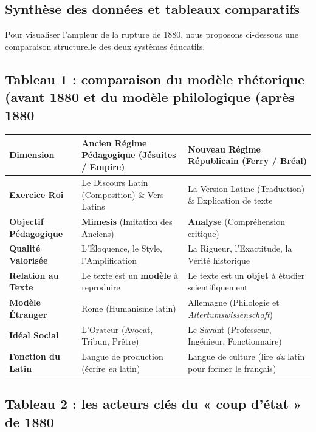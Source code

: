 \subsection{Synthèse des données et tableaux comparatifs}

Pour visualiser l'ampleur de la rupture de 1880, nous proposons ci-dessous une comparaison
structurelle des deux systèmes éducatifs.



\subsection{Tableau 1 : comparaison du modèle rhétorique (avant 1880\) et du modèle philologique (après 1880\)}

\begin{table}[h!]\small\centering\begin{tabular}{| p{2.3cm} | p{3.5cm} | p{3.5cm} |}\hline\textbf{Dimension} & \textbf{Ancien Régime Pédagogique (Jésuites / Empire)} & \textbf{Nouveau Régime Républicain (Ferry / Bréal)} \\ \hline\textbf{Exercice Roi} & Le Discours Latin (Composition) \& Vers Latins & La Version Latine (Traduction) \& Explication de texte \\ \hline\textbf{Objectif Pédagogique} & \textbf{Mimesis} (Imitation des Anciens) & \textbf{Analyse} (Compréhension critique) \\ \hline\textbf{Qualité Valorisée} & L'Éloquence, le Style, l'Amplification & La Rigueur, l'Exactitude, la Vérité historique \\ \hline\textbf{Relation au Texte} & Le texte est un \textbf{modèle} à reproduire & Le texte est un \textbf{objet} à étudier scientifiquement \\ \hline\textbf{Modèle Étranger} & Rome (Humanisme latin) & Allemagne (Philologie et \textit{Altertumswissenschaft}) \\ \hline\textbf{Idéal Social} & L'Orateur (Avocat, Tribun, Prêtre) & Le Savant (Professeur, Ingénieur, Fonctionnaire) \\ \hline\textbf{Fonction du Latin} & Langue de production (écrire \textit{en} latin) & Langue de culture (lire \textit{du} latin pour former le français) \\ \hline\end{tabular}\end{table}

\subsection{Tableau 2 : les acteurs clés du « coup d'état » de 1880}

